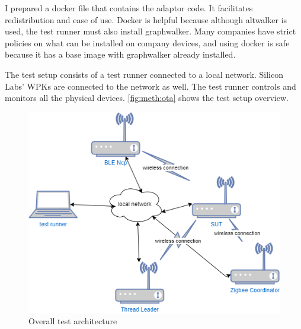 I prepared a docker file that contains the adaptor code. It facilitates redistribution and ease of use. Docker is helpful because although altwalker is used, the test runner must also install graphwalker. Many companies have strict policies on what can be installed on company devices, and using docker is safe because it has a base image with graphwalker already installed.

The test setup consists of a test runner connected to a local network. Silicon Labs' WPKs are connected to the network as well. The test runner controls and monitors all the physical devices. \autoref{fig:meth:ota} shows the test setup overview.

\begin{figure}
    \centering
    \includegraphics[width=120mm, keepaspectratio]{figures/test_setup.png}
    \caption{Overall test architecture}
    \label{fig:meth:ota}
\end{figure}